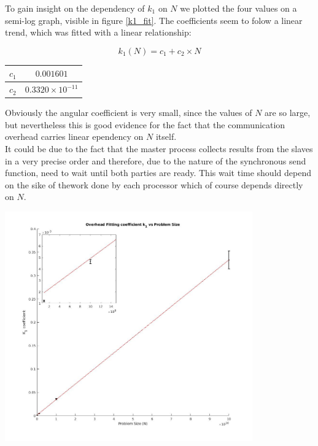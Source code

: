\documentclass{article}
\begin{document}
\begin{minipage}{\linewidth}
\begin{minipage}{0.4\linewidth}
To gain insight on the dependency of $k_1$ on $N$ we plotted the four values on a semi-log graph, visible in figure \ref{k1_fit}. The coefficients seem to folow a linear trend, which was fitted with a linear relationship:


\begin{center}

\begin{equation}
k_1 \left( N \right) = c_1 + c_2\times N	
\end{equation}


 \begin{tabular}{|c | c | } 
 \hline
 $c_1$ & $ 0.001601  $  \\ 
 \hline
 $c_2$ & $ 0.3320\times 10^{-11} $ \\
 \hline
\end{tabular}
\label{serial_coefs}

\end{center}

Obviously the angular coefficient is very small, since the values of $N$ are so large, but nevertheless this is good evidence for the fact that the communication overhead carries linear ependency on $N$ itself.\\
It could be due to the fact that the master process collects results from the slaves in a very precise order and therefore, due to the nature of the synchronous send function, need to wait until both parties are ready. This wait time should depend on the sike of thework done by each processor which of course depends directly on $N$.

\end{minipage}
\begin{minipage}{0.6\linewidth}
\includegraphics[width=0.8\textwidth]{k1_fit}
\label{k1_fit}
\end{minipage}
\end{minipage}
\end{document}
